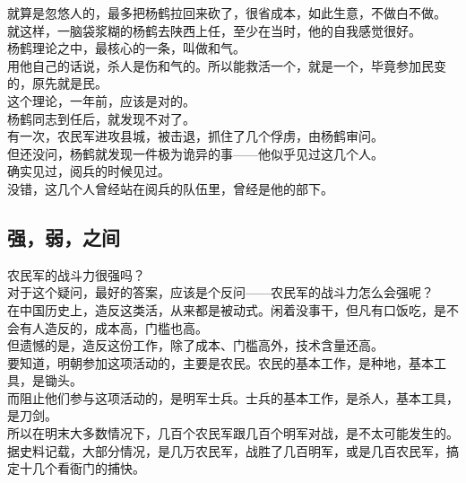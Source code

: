 \begin{multicols}{\theparacolNo}
就算是忽悠人的，最多把杨鹤拉回来砍了，很省成本，如此生意，不做白不做。\\

就这样，一脑袋浆糊的杨鹤去陕西上任，至少在当时，他的自我感觉很好。\\

杨鹤理论之中，最核心的一条，叫做和气。\\

用他自己的话说，杀人是伤和气的。所以能救活一个，就是一个，毕竟参加民变的，原先就是民。\\

这个理论，一年前，应该是对的。\\

杨鹤同志到任后，就发现不对了。\\

有一次，农民军进攻县城，被击退，抓住了几个俘虏，由杨鹤审问。\\

但还没问，杨鹤就发现一件极为诡异的事——他似乎见过这几个人。\\

确实见过，阅兵的时候见过。\\

没错，这几个人曾经站在阅兵的队伍里，曾经是他的部下。\\

\subsection{强，弱，之间}
农民军的战斗力很强吗？\\

对于这个疑问，最好的答案，应该是个反问——农民军的战斗力怎么会强呢？\\

在中国历史上，造反这类活，从来都是被动式。闲着没事干，但凡有口饭吃，是不会有人造反的，成本高，门槛也高。\\

但遗憾的是，造反这份工作，除了成本、门槛高外，技术含量还高。\\

要知道，明朝参加这项活动的，主要是农民。农民的基本工作，是种地，基本工具，是锄头。\\

而阻止他们参与这项活动的，是明军士兵。士兵的基本工作，是杀人，基本工具，是刀剑。\\

所以在明末大多数情况下，几百个农民军跟几百个明军对战，是不太可能发生的。据史料记载，大部分情况，是几万农民军，战胜了几百明军，或是几百农民军，搞定十几个看衙门的捕快。\\


\end{multicols}
